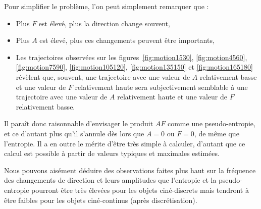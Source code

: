 	Pour simplifier le problème, l'on peut simplement remarquer que :
	\begin{itemize}
		\item Plus $F$ est élevé, plus la direction change souvent,
		\item Plus $A$ est élevé, plus ces changements peuvent être importants,
		\item Les trajectoires observées sur les figures~\ref{fig:motion1530}, \ref{fig:motion4560}, \ref{fig:motion7590}, \ref{fig:motion105120}, \ref{fig:motion135150} et \ref{fig:motion165180} révèlent que, souvent, une trajectoire avec une valeur de $A$ relativement basse et une valeur de $F$ relativement haute sera subjectivement semblable à une trajectoire avec une valeur de $A$ relativement haute et une valeur de $F$ relativement basse.
	\end{itemize}
	
	Il paraît donc raisonnable d'envisager le produit $AF$ comme une pseudo-entropie, et ce d'autant plus qu'il s'annule dès lors que $A=0$ ou $F=0$, de même que l'entropie. Il a en outre le mérite d'être très simple à calculer, d'autant que ce calcul est possible à partir de valeurs typiques et maximales estimées.
	
	Nous pouvons aisément déduire des observations faites plus haut sur la fréquence des changements de direction et leurs amplitudes que l'entropie et la pseudo-entropie pourront être très élevées pour les objets ciné-discrets mais tendront à être faibles pour les objets ciné-continus (après discrétisation).
	
